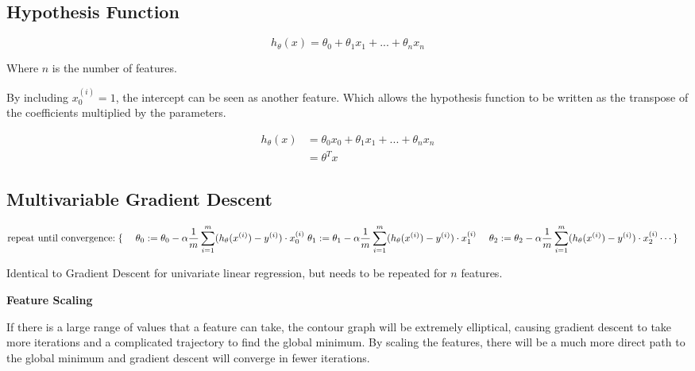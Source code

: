 \documentclass[
]{article}
\author{}
\date{}
\begin{document}
\hypertarget{header-n0}{%
\subsection{Hypothesis Function}\label{header-n0}}

\[h_\theta(x) = \theta_0 + \theta_1x_1 + ... + \theta_nx_n\]

Where \(n\) is the number of features.

By including \(x^{(i)}_0 = 1\), the intercept can be seen as another
feature. Which allows the hypothesis function to be written as the
transpose of the coefficients multiplied by the parameters.

\begin{align}
h_\theta(x) &= \theta_0x_0 + \theta_1x_1 + ... + \theta_nx_n \\
&= \theta^Tx
\end{align}

\hypertarget{header-n7}{%
\subsection{Multivariable Gradient Descent}\label{header-n7}}

\begin{align*} & \text{repeat until convergence:} \; \lbrace \newline \; & \theta_0 := \theta_0 - \alpha \frac{1}{m} \sum\limits_{i=1}^{m} (h_\theta(x^{(i)}) - y^{(i)}) \cdot x_0^{(i)}\newline \; & \theta_1 := \theta_1 - \alpha \frac{1}{m} \sum\limits_{i=1}^{m} (h_\theta(x^{(i)}) - y^{(i)}) \cdot x_1^{(i)} \newline \; & \theta_2 := \theta_2 - \alpha \frac{1}{m} \sum\limits_{i=1}^{m} (h_\theta(x^{(i)}) - y^{(i)}) \cdot x_2^{(i)} \newline & \cdots \newline \rbrace \end{align*}

Identical to Gradient Descent for univariate linear regression, but
needs to be repeated for \(n\) features.

\textbf{Feature Scaling}

If there is a large range of values that a feature can take, the contour
graph will be extremely elliptical, causing gradient descent to take
more iterations and a complicated trajectory to find the global minimum.
By scaling the features, there will be a much more direct path to the
global minimum and gradient descent will converge in fewer iterations.
\end{document}
